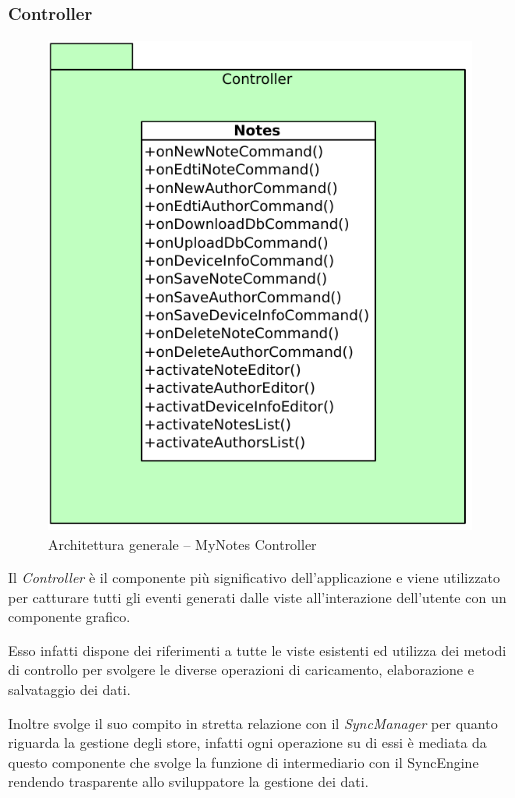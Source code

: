 \subsubsection{Controller}
\begin{figure}[htb]
\centering
\includegraphics[scale=0.6]{gfx/class/MyNotes_Controller.pdf}
\caption{Architettura generale -- MyNotes Controller}
\label{fig:architettura MyNotes Controller}
\end{figure}
Il \emph{Controller} è il componente più significativo dell'applicazione e viene utilizzato per catturare tutti gli eventi generati dalle viste all'interazione dell'utente con un componente grafico.

Esso infatti dispone dei riferimenti a tutte le viste esistenti ed utilizza dei metodi di controllo per svolgere le diverse operazioni di caricamento, elaborazione e salvataggio dei dati.

Inoltre svolge il suo compito in stretta relazione con il \emph{SyncManager} per quanto riguarda la gestione degli store, infatti ogni operazione su di essi è mediata da questo componente che svolge la funzione di intermediario con il SyncEngine rendendo trasparente allo sviluppatore la gestione dei dati.

